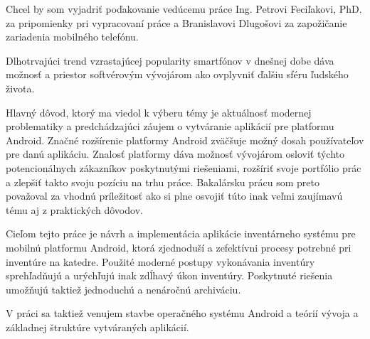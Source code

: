 \documentclass[]{tukediphc}
\begin{document}
\renewcommand\theHfigure{\theHsection.\arabic{figure}}
\renewcommand\theHtable{\theHsection.\arabic{table}}


\prvastrana

\titulnastrana

\abstraktsk %

\abstrakteng %

\kabstrakt %

\zadanieprace

\cestnevyhlasenie

\podakovanie
Chcel by som vyjadriť poďakovanie vedúcemu práce Ing. Petrovi Feciľakovi, PhD. za pripomienky pri vypracovaní práce a Branislavovi Dlugošovi za zapožičanie zariadenia mobilného telefónu.
\kpodakovania

\predhovor

Dlhotrvajúci trend vzrastajúcej popularity smartfónov v dnešnej dobe dáva možnosť a priestor softvérovým vývojárom ako ovplyvniť ďalšiu sféru ľudského života.

Hlavný dôvod, ktorý ma viedol k výberu témy je aktuálnosť modernej problematiky a predchádzajúci záujem o vytváranie aplikácií pre platformu Android. Značné rozšírenie platformy Android zväčšuje možný dosah používateľov pre danú aplikáciu. Znalosť platformy dáva možnosť vývojárom osloviť týchto potencionálnych zákazníkov poskytnutými riešeniami, rozšíriť svoje portfólio prác a zlepšiť takto svoju pozíciu na trhu práce. Bakalársku prácu som preto považoval za vhodnú príležitosť ako si plne osvojiť túto inak veľmi zaujímavú tému aj z praktických dôvodov.

Cieľom tejto práce je návrh a implementácia aplikácie inventárneho systému pre mobilnú platformu Android, ktorá zjednoduší a zefektívni procesy potrebné pri inventúre na katedre. Použité moderné postupy vykonávania inventúry sprehľadňujú a urýchľujú inak zdĺhavý úkon inventúry. Poskytnuté riešenia umožňujú taktiež jednoduchú a nenáročnú archiváciu.

V práci sa taktiež venujem stavbe operačného systému Android a teórií vývoja a základnej štruktúre vytváraných aplikácií. 

\kpredhovoru
\end{document}
